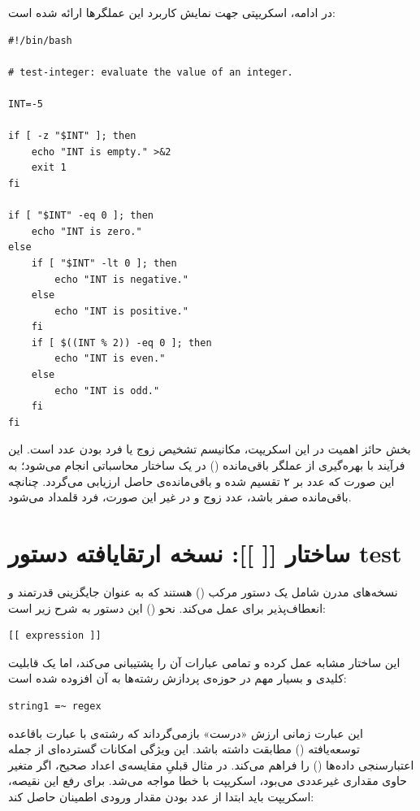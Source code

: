 در ادامه، اسکریپتی جهت نمایش کاربرد این عملگرها ارائه شده است:

\begin{latin}
\begin{lstlisting}
#!/bin/bash

# test-integer: evaluate the value of an integer.

INT=-5

if [ -z "$INT" ]; then
    echo "INT is empty." >&2
    exit 1
fi

if [ "$INT" -eq 0 ]; then
    echo "INT is zero."
else
    if [ "$INT" -lt 0 ]; then
        echo "INT is negative."
    else
        echo "INT is positive."
    fi
    if [ $((INT % 2)) -eq 0 ]; then
        echo "INT is even."
    else
        echo "INT is odd."
    fi
fi
\end{lstlisting}
\end{latin}

بخش حائز اهمیت در این اسکریپت، مکانیسم تشخیص زوج یا فرد بودن عدد است. این فرآیند با بهره‌گیری از عملگر باقی‌مانده () در یک ساختار محاسباتی انجام می‌شود؛ به این صورت که عدد بر ۲ تقسیم شده و باقی‌مانده‌ی حاصل ارزیابی می‌گردد. چنانچه باقی‌مانده صفر باشد، عدد زوج و در غیر این صورت، فرد قلمداد می‌شود.

\section{ساختار [[ ]]: نسخه ارتقایافته دستور test}

نسخه‌های مدرن  شامل یک دستور مرکب () هستند که به عنوان جایگزینی قدرتمند و انعطاف‌پذیر برای  عمل می‌کند. نحو () این دستور به شرح زیر است:

\begin{latin}
\begin{lstlisting}
[[ expression ]]
\end{lstlisting}
\end{latin}

این ساختار مشابه  عمل کرده و تمامی عبارات آن را پشتیبانی می‌کند، اما یک قابلیت کلیدی و بسیار مهم در حوزه‌ی پردازش رشته‌ها به آن افزوده شده است:

\begin{latin}
\begin{lstlisting}
string1 =~ regex
\end{lstlisting}
\end{latin}

این عبارت زمانی ارزش «درست» بازمی‌گرداند که رشته‌ی  با عبارت باقاعده توسعه‌یافته () مطابقت داشته باشد. این ویژگی امکانات گسترده‌ای از جمله اعتبارسنجی داده‌ها () را فراهم می‌کند. در مثال قبلیِ مقایسه‌ی اعداد صحیح، اگر متغیر  حاوی مقداری غیرعددی می‌بود، اسکریپت با خطا مواجه می‌شد. برای رفع این نقیصه، اسکریپت باید ابتدا از عدد بودن مقدار ورودی اطمینان حاصل کند:

